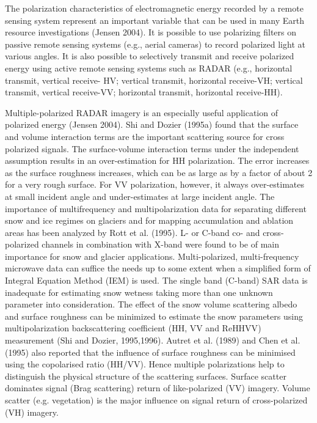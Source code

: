 The polarization characteristics of electromagnetic energy recorded by a remote sensing system represent an important variable that can be used in many Earth resource investigations (Jensen 2004). It is possible to use polarizing filters on passive remote sensing systems (e.g., aerial cameras) to record polarized light at various angles. It is also possible to selectively transmit and receive polarized energy using active remote sensing systems such as RADAR (e.g., horizontal transmit, vertical receive- HV; vertical transmit, horizontal receive-VH; vertical transmit, vertical receive-VV; horizontal transmit, horizontal receive-HH).

Multiple-polarized RADAR imagery is an especially useful application of polarized energy (Jensen 2004). Shi and Dozier (1995a) found that the surface and volume interaction terms are the important scattering source for cross polarized signals. The surface-volume interaction terms under the independent assumption results in an over-estimation for HH polarization. The error increases as the surface roughness increases, which can be as large as by a factor of about 2 for a very rough surface. For VV polarization, however, it always over-estimates at small incident angle and under-estimates at large incident angle. The importance of multifrequency and multipolarization data for separating different snow and ice regimes on glaciers and for mapping accumulation and ablation areas has been analyzed by Rott et al. (1995). L- or C-band co- and cross-polarized channels in combination with X-band were found to be of main importance for snow and glacier applications. Multi-polarized, multi-frequency microwave data can suffice the needs up to some extent when a simplified form of Integral Equation Method (IEM) is used. The single band (C-band) SAR data is inadequate for estimating snow wetness taking more than one unknown parameter into consideration. The effect of the snow volume scattering albedo and surface roughness can be minimized to estimate the snow parameters using multipolarization backscattering coefficient (HH, VV and Re{HHVV}) measurement (Shi and Dozier, 1995,1996). Autret et al. (1989) and Chen et al. (1995) also reported that the influence of surface roughness can be minimised using the copolarised ratio (HH/VV). Hence multiple polarizations help to distinguish the physical structure of the scattering surfaces. Surface scatter dominates signal (Brag scattering) return of like-polarized (VV) imagery. Volume scatter (e.g. vegetation) is the major influence on signal return of cross-polarized (VH) imagery.
